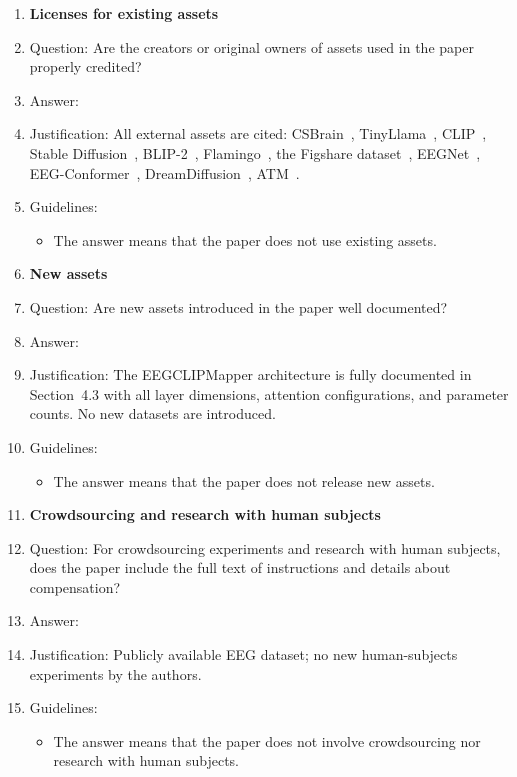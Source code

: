 \documentclass{article}
\begin{document}
\begin{enumerate}
\item {\bf Licenses for existing assets}
    \item[] Question: Are the creators or original owners of assets used in the paper properly credited?
    \item[] Answer: \answerYes{}
    \item[] Justification: All external assets are cited: CSBrain~\citep{zhu2024csbrain}, TinyLlama~\citep{zhang2024tinyllama}, CLIP~\citep{radford2021clip}, Stable Diffusion~\citep{rombach2022ldm}, BLIP-2~\citep{li2023blip2}, Flamingo~\citep{alayrac2022flamingo}, the Figshare dataset~\citep{figshare_eeg,figshare_paper}, EEGNet~\citep{lawhern2018eegnet}, EEG-Conformer~\citep{song2023eegconformer}, DreamDiffusion~\citep{bai2023dreamdiffusion}, ATM~\citep{li2024atm}.
    \item[] Guidelines:
    \begin{itemize}
        \item The answer \answerNA{} means that the paper does not use existing assets.
    \end{itemize}

\item {\bf New assets}
    \item[] Question: Are new assets introduced in the paper well documented?
    \item[] Answer: \answerYes{}
    \item[] Justification: The EEGCLIPMapper architecture is fully documented in Section~4.3 with all layer dimensions, attention configurations, and parameter counts. No new datasets are introduced.
    \item[] Guidelines:
    \begin{itemize}
        \item The answer \answerNA{} means that the paper does not release new assets.
    \end{itemize}

\item {\bf Crowdsourcing and research with human subjects}
    \item[] Question: For crowdsourcing experiments and research with human subjects, does the paper include the full text of instructions and details about compensation?
    \item[] Answer: \answerNA{}
    \item[] Justification: Publicly available EEG dataset; no new human-subjects experiments by the authors.
    \item[] Guidelines:
    \begin{itemize}
        \item The answer \answerNA{} means that the paper does not involve crowdsourcing nor research with human subjects.
    \end{itemize}


\end{enumerate}
\end{document}
